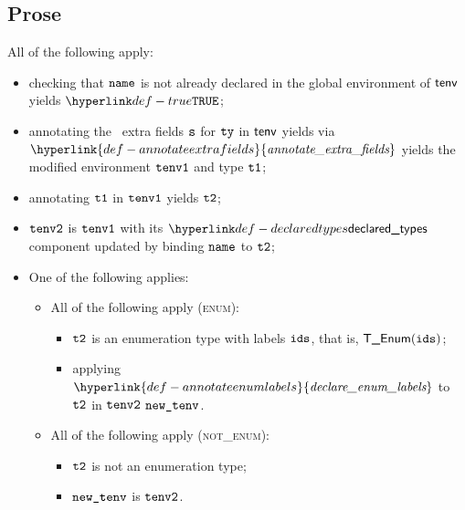 \documentclass{book}
\newcommand\ProseOrTypeError[0]{\ProseTerminateAs{\TypeErrorConfig}}
\newcommand\annotateextrafields[0]{\hyperlink{def-annotateextrafields}{\textfunc{annotate\_extra\_fields}}}
\newcommand\declareenumlabels[0]{\hyperlink{def-annotateenumlabels}{\textfunc{declare\_enum\_labels}}}
\begin{document}
\subsection{Prose}
All of the following apply:
\begin{itemize}
  \item checking that $\texttt{name}$ is not already declared in the global environment of $\textsf{tenv}$ yields $\True$\ProseOrTypeError;
  \item annotating the \optional\ extra fields $\texttt{s}$ for $\texttt{ty}$ in $\textsf{tenv}$ yields via \\ $\annotateextrafields$
        yields the modified environment $\texttt{tenv1}$ and type $\texttt{t1}$\ProseOrTypeError;
  \item annotating $\texttt{t1}$ in $\texttt{tenv1}$ yields $\texttt{t2}$\ProseOrTypeError;
  \item $\texttt{tenv2}$ is $\texttt{tenv1}$ with its $\declaredtypes$ component updated by binding $\texttt{name}$ to $\texttt{t2}$;
  \item One of the following applies:
  \begin{itemize}
    \item All of the following apply (\textsc{enum}):
    \begin{itemize}
      \item $\texttt{t2}$ is an enumeration type with labels $\texttt{ids}$, that is, $\textsf{T\_Enum}(\texttt{ids})$;
      \item applying $\declareenumlabels$ to $\texttt{t2}$ in $\texttt{tenv2}$ $\texttt{new\_tenv}$\ProseOrTypeError.
    \end{itemize}

    \item All of the following apply (\textsc{not\_enum}):
    \begin{itemize}
      \item $\texttt{t2}$ is not an enumeration type;
      \item $\texttt{new\_tenv}$ is $\texttt{tenv2}$.
    \end{itemize}
  \end{itemize}
\end{itemize}


\end{document}
